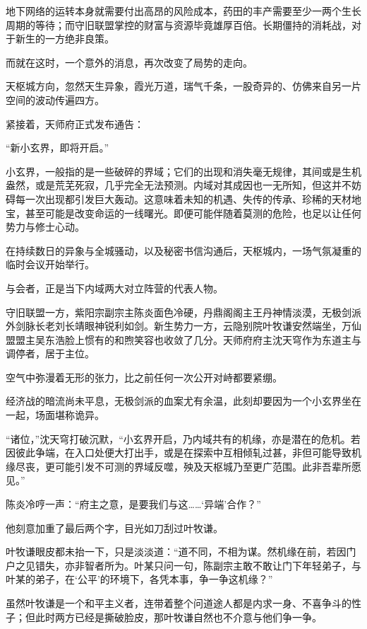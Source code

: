 地下网络的运转本身就需要付出高昂的风险成本，药田的丰产需要至少一两个生长周期的等待；而守旧联盟掌控的财富与资源毕竟雄厚百倍。长期僵持的消耗战，对于新生的一方绝非良策。

而就在这时，一个意外的消息，再次改变了局势的走向。

\vspace{2em}

天枢城方向，忽然天生异象，霞光万道，瑞气千条，一股奇异的、仿佛来自另一片空间的波动传遍四方。

紧接着，天师府正式发布通告：

“新小玄界，即将开启。”

小玄界，一般指的是一些破碎的界域；它们的出现和消失毫无规律，其间或是生机盎然，或是荒芜死寂，几乎完全无法预测。内域对其成因也一无所知，但这并不妨碍每一次出现都引发巨大轰动。这意味着未知的机遇、失传的传承、珍稀的天材地宝，甚至可能是改变命运的一线曙光。即便可能伴随着莫测的危险，也足以让任何势力与修士心动。

\vspace{2em}

在持续数日的异象与全城骚动，以及秘密书信沟通后，天枢城内，一场气氛凝重的临时会议开始举行。

与会者，正是当下内域两大对立阵营的代表人物。

守旧联盟一方，紫阳宗副宗主陈炎面色冷硬，丹鼎阁阁主王丹神情淡漠，无极剑派外剑脉长老刘长靖眼神锐利如剑。新生势力一方，云隐别院叶牧谦安然端坐，万仙盟盟主吴东浩脸上惯有的和煦笑容也收敛了几分。天师府府主沈天穹作为东道主与调停者，居于主位。

空气中弥漫着无形的张力，比之前任何一次公开对峙都要紧绷。

经济战的暗流尚未平息，无极剑派的血案尤有余温，此刻却要因为一个小玄界坐在一起，场面堪称诡异。

“诸位，”沈天穹打破沉默，“小玄界开启，乃内域共有的机缘，亦是潜在的危机。若因彼此争端，在入口处便大打出手，或是在探索中互相倾轧过甚，非但可能导致机缘尽丧，更可能引发不可测的界域反噬，殃及天枢城乃至更广范围。此非吾辈所愿见。”

陈炎冷哼一声：“府主之意，是要我们与这……‘异端’合作？”

他刻意加重了最后两个字，目光如刀刮过叶牧谦。

叶牧谦眼皮都未抬一下，只是淡淡道：“道不同，不相为谋。然机缘在前，若因门户之见错失，亦非智者所为。叶某只问一句，陈副宗主敢不敢让门下年轻弟子，与叶某的弟子，在‘公平’的环境下，各凭本事，争一争这机缘？”

虽然叶牧谦是一个和平主义者，连带着整个问道途人都是内求一身、不喜争斗的性子；但此时两方已经是撕破脸皮，那叶牧谦自然也不介意与他们争一争。

